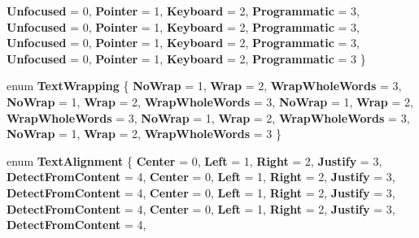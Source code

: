\begin{DoxyCompactItemize}
\newline
{\bfseries Unfocused} = 0, 
{\bfseries Pointer} = 1, 
{\bfseries Keyboard} = 2, 
{\bfseries Programmatic} = 3, 
\newline
{\bfseries Unfocused} = 0, 
{\bfseries Pointer} = 1, 
{\bfseries Keyboard} = 2, 
{\bfseries Programmatic} = 3, 
\newline
{\bfseries Unfocused} = 0, 
{\bfseries Pointer} = 1, 
{\bfseries Keyboard} = 2, 
{\bfseries Programmatic} = 3, 
\newline
{\bfseries Unfocused} = 0, 
{\bfseries Pointer} = 1, 
{\bfseries Keyboard} = 2, 
{\bfseries Programmatic} = 3
 \}
\item 
\mbox{\label{namespace_windows_1_1_u_i_1_1_xaml_aa8ebfd3700e5b390858676152a8a58e9}} 
enum {\bfseries Text\+Wrapping} \{ \newline
{\bfseries No\+Wrap} = 1, 
{\bfseries Wrap} = 2, 
{\bfseries Wrap\+Whole\+Words} = 3, 
{\bfseries No\+Wrap} = 1, 
\newline
{\bfseries Wrap} = 2, 
{\bfseries Wrap\+Whole\+Words} = 3, 
{\bfseries No\+Wrap} = 1, 
{\bfseries Wrap} = 2, 
\newline
{\bfseries Wrap\+Whole\+Words} = 3, 
{\bfseries No\+Wrap} = 1, 
{\bfseries Wrap} = 2, 
{\bfseries Wrap\+Whole\+Words} = 3, 
\newline
{\bfseries No\+Wrap} = 1, 
{\bfseries Wrap} = 2, 
{\bfseries Wrap\+Whole\+Words} = 3
 \}
\item 
\mbox{\label{namespace_windows_1_1_u_i_1_1_xaml_a096a1b0a726ae821c5a11e30eb861b63}} 
enum {\bfseries Text\+Alignment} \{ \newline
{\bfseries Center} = 0, 
{\bfseries Left} = 1, 
{\bfseries Right} = 2, 
{\bfseries Justify} = 3, 
\newline
{\bfseries Detect\+From\+Content} = 4, 
{\bfseries Center} = 0, 
{\bfseries Left} = 1, 
{\bfseries Right} = 2, 
\newline
{\bfseries Justify} = 3, 
{\bfseries Detect\+From\+Content} = 4, 
{\bfseries Center} = 0, 
{\bfseries Left} = 1, 
\newline
{\bfseries Right} = 2, 
{\bfseries Justify} = 3, 
{\bfseries Detect\+From\+Content} = 4, 
{\bfseries Center} = 0, 
\newline
{\bfseries Left} = 1, 
{\bfseries Right} = 2, 
{\bfseries Justify} = 3, 
{\bfseries Detect\+From\+Content} = 4, 
\newline

\end{DoxyCompactItemize}
